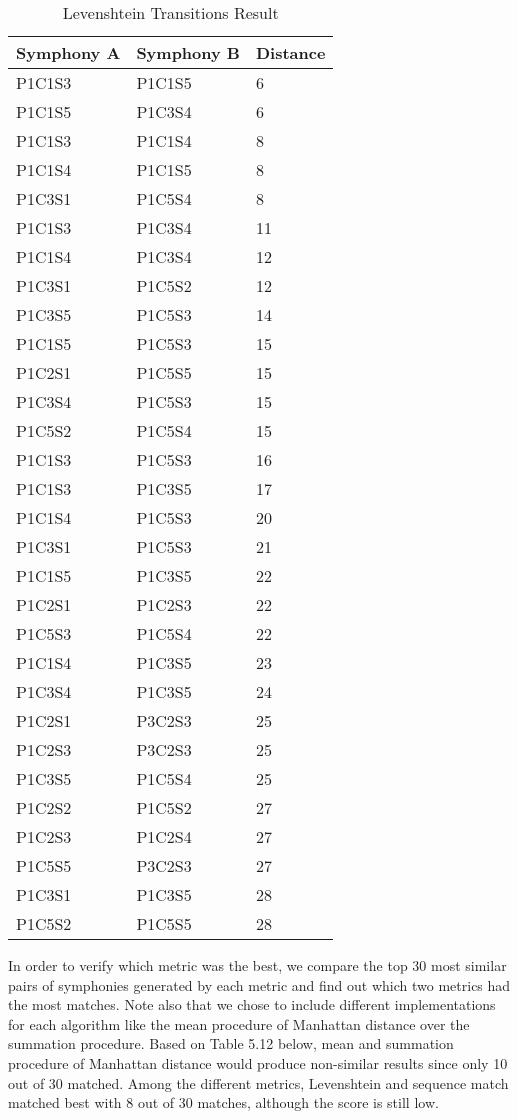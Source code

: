 \begin{longtable}{|l|l|l|}
\caption{Levenshtein Transitions Result}
\label{my-label}\\
\hline
Symphony A & Symphony B & Distance \\ \hline
\endfirsthead
%
\endhead
%
P1C1S3 & P1C1S5 & 6 \\ \hline
P1C1S5 & P1C3S4 & 6 \\ \hline
P1C1S3 & P1C1S4 & 8 \\ \hline
P1C1S4 & P1C1S5 & 8 \\ \hline
P1C3S1 & P1C5S4 & 8 \\ \hline
P1C1S3 & P1C3S4 & 11 \\ \hline
P1C1S4 & P1C3S4 & 12 \\ \hline
P1C3S1 & P1C5S2 & 12 \\ \hline
P1C3S5 & P1C5S3 & 14 \\ \hline
P1C1S5 & P1C5S3 & 15 \\ \hline
P1C2S1 & P1C5S5 & 15 \\ \hline
P1C3S4 & P1C5S3 & 15 \\ \hline
P1C5S2 & P1C5S4 & 15 \\ \hline
P1C1S3 & P1C5S3 & 16 \\ \hline
P1C1S3 & P1C3S5 & 17 \\ \hline
P1C1S4 & P1C5S3 & 20 \\ \hline
P1C3S1 & P1C5S3 & 21 \\ \hline
P1C1S5 & P1C3S5 & 22 \\ \hline
P1C2S1 & P1C2S3 & 22 \\ \hline
P1C5S3 & P1C5S4 & 22 \\ \hline
P1C1S4 & P1C3S5 & 23 \\ \hline
P1C3S4 & P1C3S5 & 24 \\ \hline
P1C2S1 & P3C2S3 & 25 \\ \hline
P1C2S3 & P3C2S3 & 25 \\ \hline
P1C3S5 & P1C5S4 & 25 \\ \hline
P1C2S2 & P1C5S2 & 27 \\ \hline
P1C2S3 & P1C2S4 & 27 \\ \hline
P1C5S5 & P3C2S3 & 27 \\ \hline
P1C3S1 & P1C3S5 & 28 \\ \hline
P1C5S2 & P1C5S5 & 28 \\ \hline
\end{longtable}

In order to verify which metric was the best, we compare the top 30 most similar pairs of symphonies generated by each metric and find out which two metrics had the most matches. Note also that we chose to include different implementations for each algorithm like the mean procedure of Manhattan distance over the summation procedure. Based on Table 5.12 below, mean and summation procedure of Manhattan distance would produce non-similar results since only 10 out of 30 matched. Among the different metrics, Levenshtein and sequence match matched best with 8 out of 30 matches, although the score is still low.

